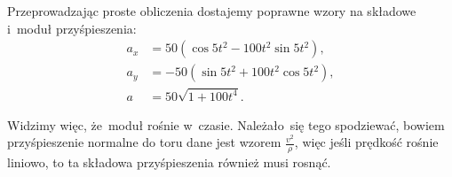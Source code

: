 \documentclass[a4paper,11pt]{article}
\begin{document}
Przeprowadzając proste obliczenia dostajemy poprawne wzory na składowe
i~moduł przyśpieszenia:
\begin{subequations}
  \begin{align}
    \label{eq:KrysickiWlodarskiAnalizaVolI-03-A}
    a_{ x } &= 50 ( \cos 5t^{ 2 } - 100 t^{ 2 } \sin 5t^{ 2 } ), \\
    \label{eq:KrysickiWlodarskiAnalizaVolI-03-B}
    a_{ y } &= -50 ( \sin 5t^{ 2 } + 100 t^{ 2 } \cos 5t^{ 2 } ), \\
    \label{eq:KrysickiWlodarskiAnalizaVolI-03-C}
    a &= 50 \sqrt{ 1 + 100 t^{ 4 } }.
  \end{align}
\end{subequations}

Widzimy więc, że~moduł rośnie w~czasie. Należało~się tego spodziewać,
bowiem przyśpieszenie normalne do toru dane jest wzorem
$\frac{ v^{ 2 } }{ \rho }$, więc jeśli prędkość rośnie liniowo, to ta
składowa przyśpieszenia również musi rosnąć.





\end{document}

